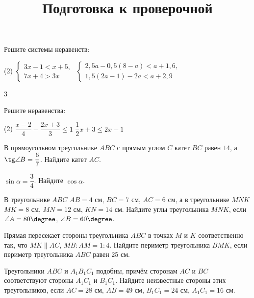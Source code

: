 \begin{homework}[number=3]
	\begin{listofex}
		\item Решите системы неравенств:
		\begin{tasks}(2)
			\task \( \left\{
			\begin{array}{l}
				3x-1<x+5,\\
				7x+4>3x
			\end{array}
			\right. \)
			\task \( \left\{
			\begin{array}{l}
				2,5a-0,5(8-a)<a+1,6,\\
				1,5(2a-1)-2a<a+2,9	
			\end{array}
			\right. \)
		\end{tasks}
		\item \exercise{2597}
		\item \exercise{2599}
		\item \exercise{2604}
	\end{listofex}3
\end{homework}

\begin{class}[number=7]
	\title{Подготовка к проверочной}
	\begin{listofex}
		\item Решите неравенства: 
		\begin{tasks}(2)
			\task \( \dfrac{x-2}{4}-\dfrac{2x+3}{3}\le1 \)
			\task \( \dfrac{1}{2}x+3\le2x-1 \)
		\end{tasks}
		\item В прямоугольном треугольнике \( ABC \) с прямым углом \( C \) катет \( BC \) равен \( 14 \), а \( \tg\angle B=\dfrac{6}{7} \). Найдите катет \( AC \).
		\item \( \sin\alpha=\dfrac{3}{4} \). Найдите \( \cos\alpha \).
		\item В треугольнике \( ABC \) \( AB=4 \) см, \( BC=7 \) см, \( AC=6 \) см, а в треугольнике \( MNK \) \( MK=8 \) см, \( MN=12 \) см, \( KN=14 \) см. Найдите углы треугольника \( MNK \), если \( \angle A=80\degree \), \( \angle B=60\degree \).
		\item Прямая пересекает стороны треугольника \( ABC \) в точках \( M \) и \( K \) соответственно так, что \( MK\parallel AC \), \( MB:AM=1:4 \). Найдите периметр треугольника \( BMK \), если периметр треугольника \( ABC \) равен \( 25 \) см.
		\item Треугольники \( ABC \) и \( A_1B_1C_1 \) подобны, причём сторонам \( AC \) и \( BC \) соответствуют стороны \( A_1C_1 \) и \( B_1C_1 \). Найдите неизвестные стороны этих треугольников, если \( AC=28 \) см, \( AB=49 \) см, \( B_1C_1=24 \) см, \( A_1C_1=16 \) см.
	\end{listofex}
\end{class}

